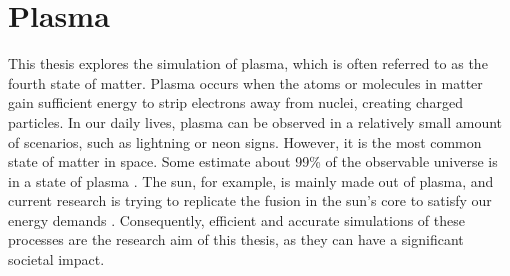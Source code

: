 \section{Plasma}
\label{sec: intro plasma}
This thesis explores the simulation of plasma, which is often referred to as the fourth state of matter. Plasma occurs when the atoms or molecules in matter gain sufficient energy to strip electrons away from nuclei, creating charged particles. In our daily lives, plasma can be observed in a relatively small amount of scenarios, such as lightning or neon signs. However, it is the most common state of matter in space. Some estimate about 99\% of the observable universe is in a state of plasma \cite{chen_introduction_1984, longair_high_2011}. The sun, for example, is mainly made out of plasma, and current research is trying to replicate the fusion in the sun's core to satisfy our energy demands \cite{degrave_magnetic_2022}. Consequently, efficient and accurate simulations of these processes are the research aim of this thesis, as they can have a significant societal impact.

